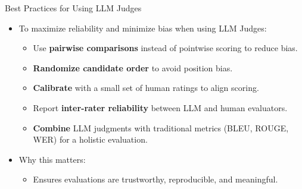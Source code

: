 \begin{frame}[allowframebreaks]{Best Practices for Using LLM Judges}

\begin{itemize}
    \item To maximize reliability and minimize bias when using LLM Judges:

    \begin{itemize}
        \item Use \textbf{pairwise comparisons} instead of pointwise scoring to reduce bias.  
        \item \textbf{Randomize candidate order} to avoid position bias.  
        \item \textbf{Calibrate} with a small set of human ratings to align scoring.  
        \item Report \textbf{inter-rater reliability} between LLM and human evaluators.  
        \item \textbf{Combine} LLM judgments with traditional metrics (BLEU, ROUGE, WER) for a holistic evaluation.
    \end{itemize}

    \item Why this matters:
    \begin{itemize}
        \item Ensures evaluations are trustworthy, reproducible, and meaningful.
    \end{itemize}
\end{itemize}

\end{frame}
